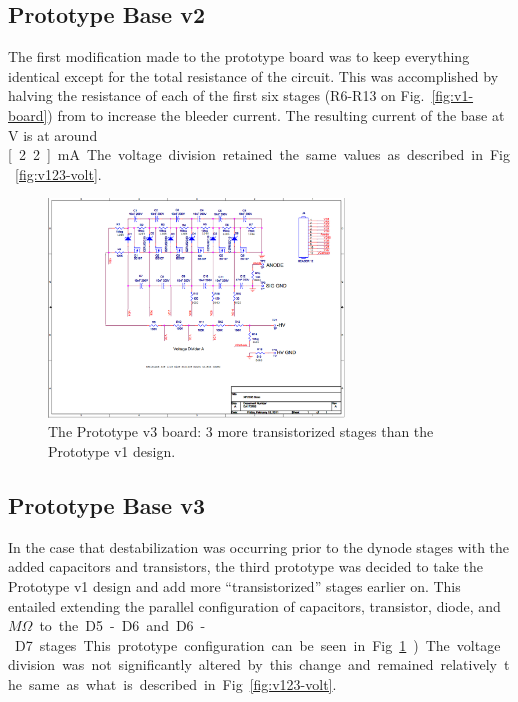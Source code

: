 \subsection{Prototype Base v2}

The first modification made to the prototype board was to keep everything identical except for the total resistance of the circuit. This was accomplished by halving the resistance of each of the first six stages (R6-R13 on Fig.~\ref{fig:v1-board}) from to increase the bleeder current. The resulting current of the base at \unit[-1500]{V} is at around \unit[2.2]{mA}. The voltage division retained the same values as described in Fig.~\ref{fig:v123-volt}.

\begin{figure}[h]
	\centerline{
		\mbox{\includegraphics[width=0.7\textwidth]{figures/pmtupgrade/newbase_6mosfet.png}}
	}
	\caption{The Prototype v3 board: 3 more transistorized stages than the Prototype v1 design.}
	\label{fig:v3-board}
\end{figure}

\subsection{Prototype Base v3}

In the case that destabilization was occurring prior to the dynode stages with the added capacitors and transistors, the third prototype was decided to take the Prototype v1 design and add more ``transistorized'' stages earlier on. This entailed extending the parallel configuration of capacitors, transistor, diode, and \unit[1]{$M\Omega$} to the D5-D6 and D6-D7 stages. This prototype configuration can be seen in Fig.~\ref{fig:v3-board}). The voltage division was not significantly altered by this change and remained relatively the same as what is described in Fig.~\ref{fig:v123-volt}.

